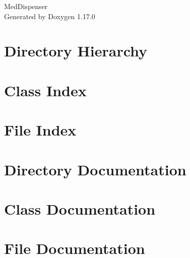 \documentclass[twoside]{book}
\newcommand{\+}{\discretionary{\mbox{\scriptsize$\hookleftarrow$}}{}{}}
\newcommand{\clearemptydoublepage}{%
    \newpage{\pagestyle{empty}\cleardoublepage}%
  }
\begin{document}
  \raggedbottom
    \hypersetup{pageanchor=false,
                bookmarksnumbered=true,
                pdfencoding=unicode
               }
  \begin{titlepage}
  \vspace*{7cm}
  \begin{center}%
  {\Large Med\+Dispenser}\\
  \vspace*{1cm}
  {\large Generated by Doxygen 1.17.0}\\
  \end{center}
  \end{titlepage}
  \clearemptydoublepage
  \tableofcontents
  \clearemptydoublepage
  \hypersetup{pageanchor=true}
\chapter{Directory Hierarchy}

\chapter{Class Index}

\chapter{File Index}

\chapter{Directory Documentation}

\chapter{Class Documentation}

\chapter{File Documentation}

  \backmatter
  \newpage
  \clearemptydoublepage
  \printindex
\end{document}
